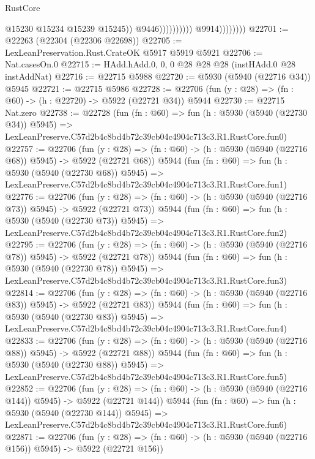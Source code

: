 \begin{lexlean}{RustCore}
\begin{coremodule}
                                            @15230
                                            @15234
                                            @15239
                                            @15245))
                                        @9446))))))))))
                    @9914))))))))
@22701 := @22263 (@22304 (@22306 @22698))
@22705 := LexLeanPreservation.Rust.CrateOK @5917 @5919 @5921
@22706 := Nat.casesOn.{0}
@22715 := HAdd.hAdd.{0, 0, 0} @28 @28 @28 (instHAdd.{0} @28 instAddNat)
@22716 := @22715 @5988
@22720 := @5930 (@5940 (@22716 @34)) @5945
@22721 := @22715 @5986
@22728 := @22706 (fun (y : @28) => (fn : @60) -> (h : @22720) -> @5922 (@22721 @34)) @5944
@22730 := @22715 Nat.zero
@22738 := @22728
    (fun (fn : @60) =>
    fun (h : @5930 (@5940 (@22730 @34)) @5945) =>
    LexLeanPreserve.C57d2b4c8bd4b72c39cb04c4904c713c3.R1.RustCore.fun0)
@22757 := @22706
    (fun (y : @28) => (fn : @60) -> (h : @5930 (@5940 (@22716 @68)) @5945) -> @5922 (@22721 @68))
    @5944
    (fun (fn : @60) =>
    fun (h : @5930 (@5940 (@22730 @68)) @5945) =>
    LexLeanPreserve.C57d2b4c8bd4b72c39cb04c4904c713c3.R1.RustCore.fun1)
@22776 := @22706
    (fun (y : @28) => (fn : @60) -> (h : @5930 (@5940 (@22716 @73)) @5945) -> @5922 (@22721 @73))
    @5944
    (fun (fn : @60) =>
    fun (h : @5930 (@5940 (@22730 @73)) @5945) =>
    LexLeanPreserve.C57d2b4c8bd4b72c39cb04c4904c713c3.R1.RustCore.fun2)
@22795 := @22706
    (fun (y : @28) => (fn : @60) -> (h : @5930 (@5940 (@22716 @78)) @5945) -> @5922 (@22721 @78))
    @5944
    (fun (fn : @60) =>
    fun (h : @5930 (@5940 (@22730 @78)) @5945) =>
    LexLeanPreserve.C57d2b4c8bd4b72c39cb04c4904c713c3.R1.RustCore.fun3)
@22814 := @22706
    (fun (y : @28) => (fn : @60) -> (h : @5930 (@5940 (@22716 @83)) @5945) -> @5922 (@22721 @83))
    @5944
    (fun (fn : @60) =>
    fun (h : @5930 (@5940 (@22730 @83)) @5945) =>
    LexLeanPreserve.C57d2b4c8bd4b72c39cb04c4904c713c3.R1.RustCore.fun4)
@22833 := @22706
    (fun (y : @28) => (fn : @60) -> (h : @5930 (@5940 (@22716 @88)) @5945) -> @5922 (@22721 @88))
    @5944
    (fun (fn : @60) =>
    fun (h : @5930 (@5940 (@22730 @88)) @5945) =>
    LexLeanPreserve.C57d2b4c8bd4b72c39cb04c4904c713c3.R1.RustCore.fun5)
@22852 := @22706
    (fun (y : @28) => (fn : @60) -> (h : @5930 (@5940 (@22716 @144)) @5945) -> @5922 (@22721 @144))
    @5944
    (fun (fn : @60) =>
    fun (h : @5930 (@5940 (@22730 @144)) @5945) =>
    LexLeanPreserve.C57d2b4c8bd4b72c39cb04c4904c713c3.R1.RustCore.fun6)
@22871 := @22706
    (fun (y : @28) => (fn : @60) -> (h : @5930 (@5940 (@22716 @156)) @5945) -> @5922 (@22721 @156))

\end{coremodule}
\end{lexlean}
